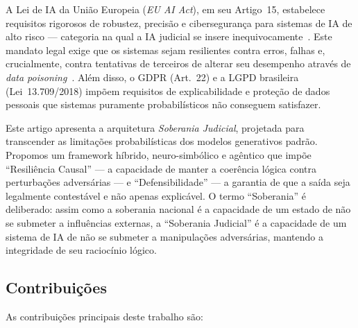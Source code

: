 \documentclass[journal,10pt]{IEEEtran}
\begin{document}
A Lei de IA da Uni\~{a}o Europeia (\textit{EU AI Act}), em seu Artigo~15, estabelece requisitos rigorosos de robustez, precis\~{a}o e ciberseguran\c{c}a para sistemas de IA de alto risco --- categoria na qual a IA judicial se insere inequivocamente~\cite{euaiact2024,euaiactsd2024}. Este mandato legal exige que os sistemas sejam resilientes contra erros, falhas e, crucialmente, contra tentativas de terceiros de alterar seu desempenho atrav\'{e}s de \textit{data poisoning}~\cite{euaiact2024}. Al\'{e}m disso, o GDPR (Art.~22) e a LGPD brasileira (Lei~13.709/2018) imp\~{o}em requisitos de explicabilidade e prote\c{c}\~{a}o de dados pessoais que sistemas puramente probabil\'{i}sticos n\~{a}o conseguem satisfazer.

Este artigo apresenta a arquitetura \textit{Soberania Judicial}, projetada para transcender as limita\c{c}\~{o}es probabil\'{i}sticas dos modelos generativos padr\~{a}o. Propomos um framework h\'{i}brido, neuro-simb\'{o}lico e ag\^{e}ntico que imp\~{o}e ``Resili\^{e}ncia Causal'' --- a capacidade de manter a coer\^{e}ncia l\'{o}gica contra perturba\c{c}\~{o}es advers\'{a}rias --- e ``Defensibilidade'' --- a garantia de que a sa\'{i}da seja legalmente contest\'{a}vel e n\~{a}o apenas explic\'{a}vel. O termo ``Soberania'' \'{e} deliberado: assim como a soberania nacional \'{e} a capacidade de um estado de n\~{a}o se submeter a influ\^{e}ncias externas, a ``Soberania Judicial'' \'{e} a capacidade de um sistema de IA de n\~{a}o se submeter a manipula\c{c}\~{o}es advers\'{a}rias, mantendo a integridade de seu racioc\'{i}nio l\'{o}gico.

\subsection{Contribui\c{c}\~{o}es}

As contribui\c{c}\~{o}es principais deste trabalho s\~{a}o:
\end{document}

